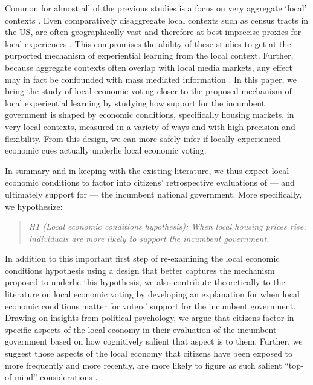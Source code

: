 \documentclass[12pt,a4paper]{article}
\begin{document}
	
	Common for almost all of the previous studies is a focus on very aggregate `local’ contexts \citep[for an exception see][]{ bisgaard2016reconsidering}. Even comparatively disaggregate local contexts such as census tracts in the US, are often geographically vast and therefore at best imprecise proxies for local experiences \citep{dinesen2015ethnic, healy2017presidential, moore2017learning}. This compromises the ability of these studies to get at the purported mechanism of experiential learning from the local context. Further, because aggregate contexts often overlap with local media markets, any effect may in fact be confounded with mass mediated information \citep{books1999contextual, reeves2012ecologies}. In this paper, we bring the study of local economic voting closer to the proposed mechanism of local experiential learning by studying how support for the incumbent government is shaped by economic conditions, specifically housing markets, in very local contexts, measured in a variety of ways and with high precision and flexibility. From this design, we can more safely infer if locally experienced economic cues actually underlie local economic voting.
	
	In summary and in keeping with the existing literature, we thus expect local economic conditions to factor into citizens’ retrospective evaluations of — and ultimately support for — the incumbent national government. More specifically, we hypothesize:
	
	\newcommand{\hone}{the local economic conditions hypothesis}
	
	\begin{quote}
		
		\textit{H1 (Local economic conditions hypothesis): When local housing prices rise, individuals are more likely to support the incumbent government.}
		
	\end{quote}
	
	
	In addition to this important first step of re-examining the local economic conditions hypothesis using a design that better captures the mechanism proposed to underlie this hypothesis, we also contribute theoretically to the literature on local economic voting by developing an explanation for when local economic conditions matter for voters’ support for the incumbent government. Drawing on insights from political psychology, we argue that citizens factor in specific aspects of the local economy in their evaluation of the incumbent government based on how cognitively salient that aspect is to them. Further, we suggest those aspects of the local economy that citizens have been exposed to more frequently and more recently, are more likely to figure as such salient “top-of-mind” considerations \citep{zaller1992nature}. 
	
\end{document}
